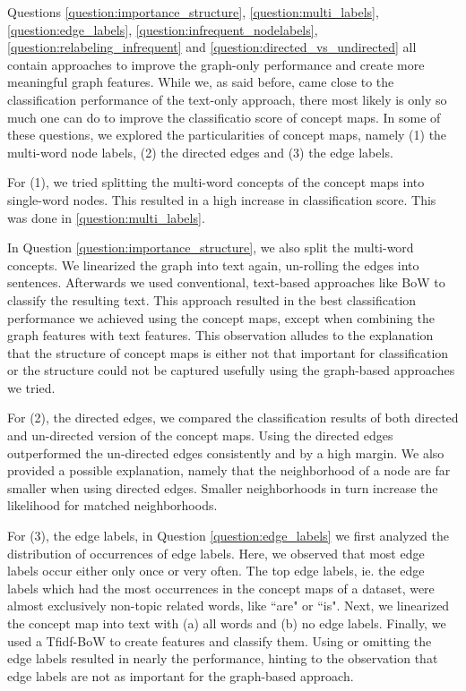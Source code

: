 Questions \ref{question:importance_structure}, \ref{question:multi_labels}, \ref{question:edge_labels}, \ref{question:infrequent_nodelabels}, \ref{question:relabeling_infrequent} and  \ref{question:directed_vs_undirected} all contain approaches to improve the graph-only performance and create more meaningful graph features.
While we, as said before, came close to the classification performance of the text-only approach, there most likely is only so much one can do to improve the classificatio score of concept maps.
In some of these questions, we explored the particularities of concept maps, namely (1) the multi-word node labels, (2) the directed edges and (3) the edge labels.

For (1), we tried splitting the multi-word concepts of the concept maps into single-word nodes.
This resulted in a high increase in classification score.
This was done in \ref{question:multi_labels}.

In Question \ref{question:importance_structure}, we also split the multi-word concepts. We linearized the graph into text again, un-rolling the edges into sentences. Afterwards we used conventional, text-based approaches like BoW to classify the resulting text.
This approach resulted in the best classification performance we achieved using the concept maps, except when combining the graph features with text features.
This observation alludes to the explanation that the structure of concept maps is either not that important for classification or the structure could not be captured usefully using the graph-based approaches we tried.

For (2), the directed edges, we compared the classification results of both directed and un-directed version of the concept maps.
Using the directed edges outperformed the un-directed edges consistently and by a high margin.
We also provided a possible explanation, namely that the neighborhood of a node are far smaller when using directed edges.
Smaller neighborhoods in turn increase the likelihood for matched neighborhoods.

For (3), the edge labels, in Question \ref{question:edge_labels} we first analyzed the distribution of occurrences of edge labels. Here, we observed that most edge labels occur either only once or very often.
The top edge labels, ie. the edge labels which had the most occurrences in the concept maps of a dataset, were almost exclusively non-topic related words, like ``are" or ``is".
Next, we linearized the concept map into text with (a) all words and (b) no edge labels.
Finally, we used a Tfidf-BoW to create features and classify them.
Using or omitting the edge labels resulted in nearly the performance, hinting to the observation that edge labels are not as important for the graph-based approach.

